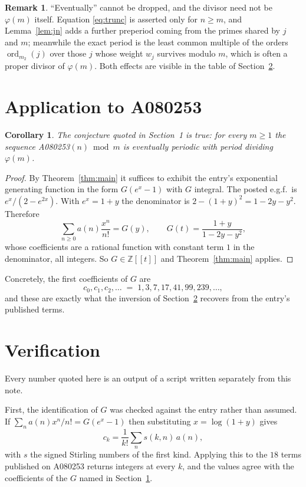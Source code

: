 \documentclass[11pt,a4paper]{article}
\theoremstyle{plain}
\newtheorem{corollary}[theorem]{Corollary}
\theoremstyle{definition}
\newtheorem{remark}[theorem]{Remark}
\newcommand{\ord}{\operatorname{ord}}
\newcommand{\Z}{\mathbb{Z}}
\begin{document}
\begin{remark}
``Eventually'' cannot be dropped, and the divisor need not be $\varphi(m)$ itself.
Equation \eqref{eq:trunc} is asserted only for $n\ge m$, and Lemma~\ref{lem:jn} adds a
further preperiod coming from the primes shared by $j$ and $m$; meanwhile the exact period
is the least common multiple of the orders $\ord_{m_{2}}(j)$ over those $j$ whose weight
$w_{j}$ survives modulo $m$, which is often a proper divisor of $\varphi(m)$. Both effects
are visible in the table of Section~\ref{sec:ver}.
\end{remark}

\section{Application to A080253}\label{sec:apply}

\begin{corollary}\label{cor:this}
The conjecture quoted in Section~1 is true: for every $m\ge1$ the sequence
A080253$(n) \bmod m$ is eventually periodic with period dividing $\varphi(m)$.
\end{corollary}

\begin{proof}
By Theorem~\ref{thm:main} it suffices to exhibit the entry's exponential generating
function in the form $G(e^{x}-1)$ with $G$ integral. The posted e.g.f.\ is $e^{x}/(2-e^{2x})$. With $e^{x}=1+y$ the denominator is $2-(1+y)^{2}=1-2y-y^{2}$. Therefore
\[
\sum_{n\ge0}a(n)\frac{x^{n}}{n!}=G(y),\qquad G(t)=\frac{1+y}{1-2y-y^{2}} ,
\]
whose coefficients are a rational function with constant term $1$ in the denominator, all integers. So $G\in\Z[[t]]$ and
Theorem~\ref{thm:main} applies.
\end{proof}

Concretely, the first coefficients of $G$ are
\[
c_{0},c_{1},c_{2},\dots \;=\; 1, 3, 7, 17, 41, 99, 239, \dots ,
\]
and these are exactly what the inversion of Section~\ref{sec:ver} recovers from the
entry's published terms.

\section{Verification}\label{sec:ver}

Every number quoted here is an output of a script written separately from this note.

First, the identification of $G$ was checked against the entry rather than assumed. If
$\sum_{n}a(n)x^{n}/n!=G(e^{x}-1)$ then substituting $x=\log(1+y)$ gives
\[
c_{k}=\frac{1}{k!}\sum_{n}s(k,n)\,a(n),
\]
with $s$ the signed Stirling numbers of the first kind. Applying this to the
$18$ terms published on A080253 returns integers at every $k$, and the values
agree with the coefficients of the $G$ named in Section~\ref{sec:apply}.
\end{document}
